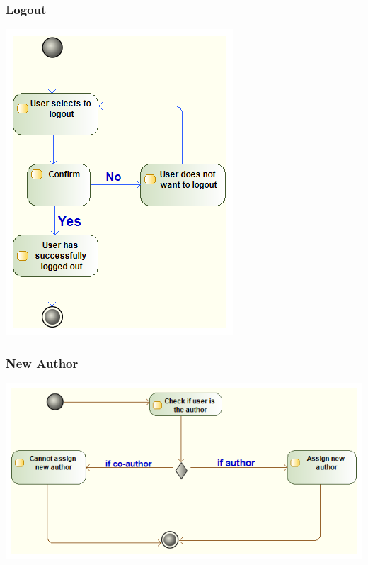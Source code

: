 \documentclass[11pt]{article}
\begin{document}
\subsubsection{Logout}
\begin{center} 
	\includegraphics[width=\textwidth]{../Images/Logout_Activity_Diagram.png}\\[0.5cm]
\end{center}

\newpage
\subsubsection{New Author}
\begin{center} 
	\includegraphics[width=\textwidth]{../Images/newAuthor_Activity_Diagram.png}\\[0.5cm]
\end{center}
\end{document}
